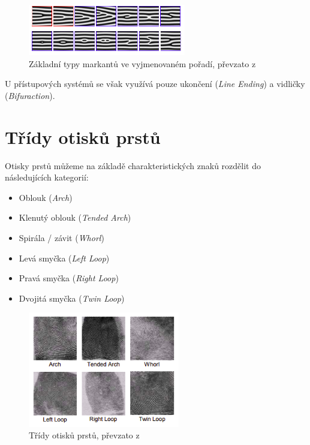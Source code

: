\begin{figure}[!htbp]
    \centering
    \includegraphics[width=260px]{obrazky-figures/markants.png}
    \caption{Základní typy markantů ve vyjmenovaném pořadí, převzato z \cite{Drahansky}}
\end{figure}

U přístupových systémů se však využívá pouze ukončení (\textit{Line Ending}) a vidličky (\textit{Bifuraction}). \cite{Drahansky}

\section{Třídy otisků prstů}
Otisky prstů můžeme na základě charakteristických znaků rozdělit do následujících kategorií: \cite{Drahansky}
\begin{itemize}
    \item Oblouk (\textit{Arch})
    \item Klenutý oblouk (\textit{Tended Arch})
    \item Spirála / závit (\textit{Whorl})
    \item Levá smyčka (\textit{Left Loop})
    \item Pravá smyčka (\textit{Right Loop})
    \item Dvojitá smyčka (\textit{Twin Loop})
\end{itemize}

\begin{figure}[!htbp]
    \centering
    \includegraphics[width=250px]{obrazky-figures/classes.png}
    \caption{Třídy otisků prstů, převzato z \cite{Drahansky}}
\end{figure}

